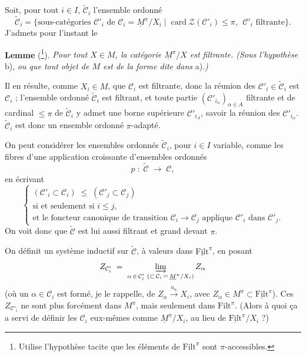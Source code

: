 \documentclass[11pt]{article}
\newcommand{\printedpage}[1]{\marginpar{\footnotesize p.~#1}}
\newcommand{\msp}[1]{\marginpar{\footnotesize [#1]}}
\begin{document}
\printedpage{50}

\msp{page 93}Soit, pour tout $i\in I$, $\tilde{\mathcal{C}}_i$ l'ensemble ordonné
\[ \tilde{\mathcal{C}}_i = \{\text{sous-catégories } \mathcal{C}'_i \text{ de } \mathcal{C}_i = \underline{M}^\pi/X_i \mid \operatorname{card}\mathcal{Z}(\mathcal{C}'_i)\le\pi,\ \ \mathcal{C}'_i \text{ filtrante}\}. \]
J'admets pour l'instant le

\textbf{Lemme} (\footnote[44]{Utilise l'hypothèse tacite que les éléments de $\mathrm{Filt}^\pi$ sont $\pi$-accessibles.}). \textit{Pour tout $X\in M$, la catégorie $\underline{M}^\pi/X$ est filtrante. (Sous l'hypothèse} b), \textit{ou que tout objet de $M$ est de la forme dite dans} a).\textit{)}

Il en résulte, comme $X_i\in M$, que $\mathcal{C}_i$ est filtrante, donc la réunion des $\mathcal{C}'_i\in\tilde{\mathcal{C}}_i$ est $\mathcal{C}_i$ ; l'ensemble ordonné $\tilde{\mathcal{C}}_i$ est filtrant, et toute partie $(\mathcal{C}'_{i_\alpha})_{\alpha\in A}$ filtrante et de cardinal $\le\pi$ de $\tilde{\mathcal{C}}_i$ y admet une borne supérieure $\mathcal{C}'_{i_A}$, savoir la réunion des $\mathcal{C}'_{i_\alpha}$. $\tilde{\mathcal{C}}_i$ est donc un ensemble ordonné $\pi$-adapté.

On peut considérer les ensembles ordonnés $\tilde{\mathcal{C}}_i$, pour $i\in I$ variable, comme les fibres d'une application croissante d'ensembles ordonnés
\[ p \;:\; \tilde{\mathcal{C}} \;\longrightarrow\; \mathcal{C}, \]
en écrivant
\[ \left\{ \begin{array}{l}
(\mathcal{C}'_i\subset\mathcal{C}_i) \;\le\; (\mathcal{C}'_j\subset\mathcal{C}_j) \\
\text{si et seulement si } i\le j, \\
\text{et le foncteur canonique de transition } \mathcal{C}_i\longrightarrow\mathcal{C}_j \text{ applique } \mathcal{C}'_i \text{ dans } \mathcal{C}'_j.
\end{array}\right. \]
On voit donc que $\tilde{\mathcal{C}}$ est lui aussi filtrant et grand devant $\pi$.

\msp{page 94}On définit un système inductif sur $\tilde{\mathcal{C}}$, à valeurs dans $\underline{\mathrm{Filt}}^\pi$, en posant
\[ Z_{\mathcal{C}'_i} \;=\; \varinjlim_{\alpha\,\in\,\mathcal{C}'_i\ (\subset\,\mathcal{C}_i\,=\,\underline{M}^\pi/X_i)} Z_\alpha \]
(où un $\alpha\in\mathcal{C}_i$ est formé, je le rappelle, de $Z_\alpha\xrightarrow{u_\alpha}X_i$, avec $Z_\alpha\in M^\pi\subset\underline{\mathrm{Filt}}^\pi$). Ces $Z_{\mathcal{C}'_i}$ ne sont plus forcément dans $M^\pi$, mais seulement dans $\mathrm{Filt}^\pi$. (Alors à quoi ça a servi de définir les $\mathcal{C}_i$ eux-mêmes comme $\underline{M}^\pi/X_i$, au lieu de $\underline{\mathrm{Filt}}^\pi/X_i$ ?)
\end{document}
